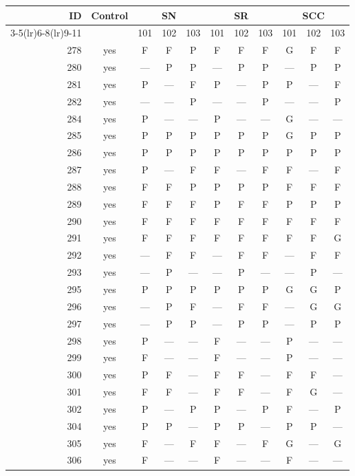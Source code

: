 \begin{table}[p]\centering\small
\begin{tabular*}{\textwidth}{@{\extracolsep{\fill}}rc*{9}{c}@{}}\toprule
ID & Control & \multicolumn{3}{c}{SN} & \multicolumn{3}{c}{SR} & \multicolumn{3}{c}{SCC}\\
\cmidrule(lr){3-5}\cmidrule(lr){6-8}\cmidrule(lr){9-11}
 & & 101 & 102 & 103 & 101 & 102 & 103 & 101 & 102 & 103\\\midrule
278 & yes & F & F & P & F & F & F & G & F & F\\
280 & yes & — & P & P & — & P & P & — & P & P\\
281 & yes & P & — & F & P & — & P & P & — & F\\
282 & yes & — & — & P & — & — & P & — & — & P\\
284 & yes & P & — & — & P & — & — & G & — & —\\
285 & yes & P & P & P & P & P & P & G & P & P\\
286 & yes & P & P & P & P & P & P & P & P & P\\
287 & yes & P & — & F & F & — & F & F & — & F\\
288 & yes & F & F & P & P & P & P & F & F & F\\
289 & yes & F & F & F & P & F & F & P & P & P\\
290 & yes & F & F & F & F & F & F & F & F & F\\
291 & yes & F & F & F & F & F & F & F & F & G\\
292 & yes & — & F & F & — & F & F & — & F & F\\
293 & yes & — & P & — & — & P & — & — & P & —\\
295 & yes & P & P & P & P & P & P & G & G & P\\
296 & yes & — & P & F & — & F & F & — & G & G\\
297 & yes & — & P & P & — & P & P & — & P & P\\
298 & yes & P & — & — & F & — & — & P & — & —\\
299 & yes & F & — & — & F & — & — & P & — & —\\
300 & yes & P & F & — & F & F & — & F & F & —\\
301 & yes & F & F & — & F & F & — & F & G & —\\
302 & yes & P & — & P & P & — & P & F & — & P\\
304 & yes & P & P & — & P & P & — & P & P & —\\
305 & yes & F & — & F & F & — & F & G & — & G\\
306 & yes & F & — & — & F & — & — & F & — & —\\

\end{tabular*}
\end{table}
